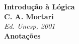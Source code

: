 \documentclass[12pt]{article}
\begin{document}
\begin{titlepage}
    \begin{center}
        {\Huge\bfseries\color{logicRed}Introdução à Lógica}\\
        \vspace{0.5cm}
        {\Large\textbf{\color{logicGray}C. A. Mortari}}\\
        {\color{logicGray}\textit{Ed. Unesp, 2001}}\\
        \vspace{1cm}
        {\large\textbf{Anotações}}\\
        \vfill
    \end{center}
    \vspace{1cm}
    \tableofcontents
    \thispagestyle{empty}
\end{titlepage}


\end{document}
